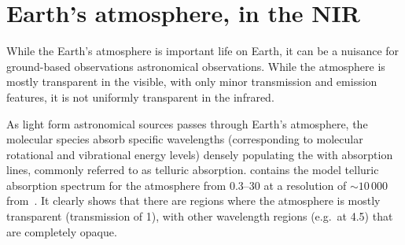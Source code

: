 
\section{Earth's atmosphere, in the NIR}

While the Earth's atmosphere is important life on Earth, it can be a nuisance for ground-based observations astronomical observations.
While the atmosphere is mostly transparent in the visible, with only minor transmission and emission features, it is not uniformly transparent in the infrared.

As light form astronomical sources passes through Earth's atmosphere, the molecular species absorb specific wavelengths (corresponding to molecular rotational and vibrational energy levels) densely populating the \nir{} with absorption lines, commonly referred to as telluric absorption.
 contains the model telluric absorption spectrum for the atmosphere from 0.3--30\um{} at a resolution of $\sim 10\,000$ from~\citet{smette_molecfit_2015}.
It clearly shows that there are regions where the atmosphere is mostly transparent (transmission of 1), with other wavelength regions (e.g.\ at 4.5\um{}) that are completely opaque.

